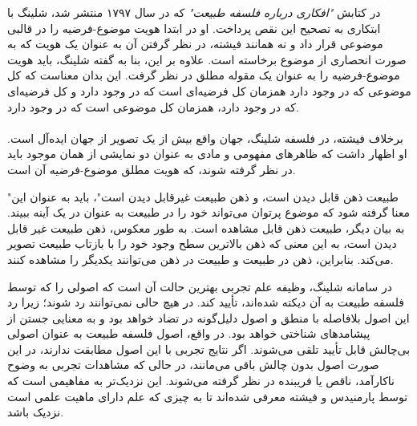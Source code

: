 \documentclass[10pt,a4paper]{article}
\begin{document}
                    در کتابش \textit{"افکاری درباره فلسفه طبیعت"} که در سال ۱۷۹۷ منتشر شد، شلینگ با ابتکاری به تصحیح این نقص پرداخت. او در ابتدا هویت موضوع-فرضیه را در قالبی موضوعی قرار داد و نه همانند فیشته، در نظر گرفتن آن به عنوان یک هویت که به صورت انحصاری از موضوع برخاسته است. علاوه بر این، بنا به گفته شلینگ، باید هویت موضوع-فرضیه را به عنوان یک مقوله مطلق در نظر گرفت. این بدان معناست که کل موضوعی که در وجود دارد همزمان کل فرضیه‌ای است که در وجود دارد و کل فرضیه‌ای که در وجود دارد، همزمان کل موضوعی است که در وجود دارد.
                    \\
                    \\
برخلاف فیشته، در فلسفه شلینگ، جهان واقع بیش از یک تصویر از جهان ایده‌آل است. او اظهار داشت که ظاهرهای مفهومی و مادی به عنوان دو نمایشی از همان موجود باید در نظر گرفته شوند، که هویت مطلق موضوع-فرضیه آن است.
                \begin{qt}
                    "طبیعت ذهن قابل دیدن است، و ذهن طبیعت غیرقابل دیدن است"، باید به عنوان این معنا گرفته شود که موضوع پرتوان می‌تواند خود را در طبیعت به عنوان در یک آینه ببیند. به بیان دیگر، طبیعت ذهن قابل مشاهده است. به طور معکوس، ذهن طبیعت غیر قابل دیدن است، به این معنی که ذهن بالاترین سطح وجود خود را با بازتاب طبیعت تصویر می‌کند. بنابراین، ذهن در طبیعت و طبیعت در ذهن می‌توانند یکدیگر را مشاهده کنند.
                \end{qt}
در سامانه شلینگ، وظیفه علم تجربی بهترین حالت آن است که اصولی را که توسط فلسفه طبیعت به آن دیکته شده‌اند، تأیید کند. در هیچ حالی نمی‌توانند رد شوند؛ زیرا رد این اصول بلافاصله با منطق و اصول دلیل‌گونه در تضاد خواهد بود و به معنایی جستن از پیشامدهای شناختی خواهد بود. در واقع، اصول فلسفه طبیعت به عنوان اصولی بی‌چالش قابل تأیید تلقی می‌شوند. اگر نتایج تجربی با این اصول مطابقت ندارند، در این صورت اصول بدون چالش باقی می‌مانند، در حالی که مشاهدات تجربی به وضوح ناکارآمد، ناقص یا فریبنده در نظر گرفته می‌شوند. این نزدیک‌تر به مفاهیمی است که توسط پارمنیدس و فیشته معرفی شده‌اند تا به چیزی که علم دارای ماهیت علمی است نزدیک باشد. 
\end{document}
